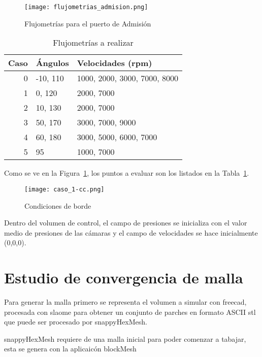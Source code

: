 \begin{figure}
    \centering
    \texttt{[image: flujometrias\_admision.png]}
    \caption{Flujometrías para el puerto de Admisión}\label{fig:flujometrias}
\end{figure}

\begin{table}
    \centering
    \begin{tabular}{rll} \toprule
        Caso & Ángulos  & Velocidades (rpm) \\ \midrule
        0    & -10, 110 & 1000, 2000, 3000, 7000, 8000 \\
        1    & 0, 120   & 2000, 7000 \\
        2    & 10, 130  & 2000, 7000 \\
        3    & 50, 170  & 3000, 7000, 9000 \\
        4    & 60, 180  & 3000, 5000, 6000, 7000 \\
        5    & 95       & 1000, 7000\\ \bottomrule
    \end{tabular}
    \caption{Flujometrías a realizar}\label{tab:casos}
\end{table}

Como se ve en la Figura~\ref{fig:flujometrias}, los puntos a evaluar son los
listados en la Tabla~\ref{tab:casos}.



\begin{figure}[h]
    \texttt{[image: caso\_1-cc.png]}
    \caption{Condiciones de borde}\label{fig:geom}
\end{figure}

Dentro del volumen de control, el campo de presiones se inicializa con el valor
medio de presiones de las cámaras y el campo de velocidades se hace
inicialmente (0,0,0).

\section{Estudio de convergencia de malla}
%
Para generar la malla primero se representa el volumen a simular con freecad,
procesada con slaome para obtener un conjunto de parches en formato ASCII stl
que puede ser procesado por snappyHexMesh.

snappyHexMesh requiere de una malla inicial para poder comenzar a tabajar, esta
se genera con la aplicaicón blockMesh





